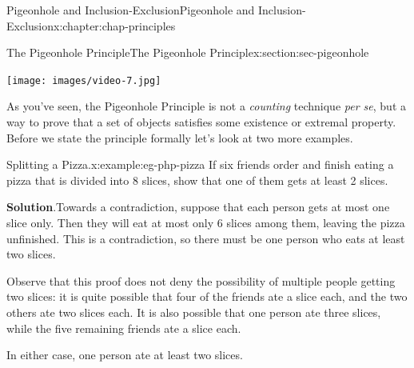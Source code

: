 \documentclass[oneside,10pt,]{book}
\newcommand{\blocktitlefont}{\relax}
\numberwithin{equation}{section}
\newlength{\qrsize}
\newlength{\previewwidth}
\begin{document}
\begin{chapterptx}{Pigeonhole and Inclusion-Exclusion}{}{Pigeonhole and Inclusion-Exclusion}{}{}{x:chapter:chap-principles}
\begin{sectionptx}{The Pigeonhole Principle}{}{The Pigeonhole Principle}{}{}{x:section:sec-pigeonhole}
\begin{sidebyside}{1}{0.1}{0.1}{0}
\begin{sbspanel}{0.8}
\begin{tcbraster}[raster columns=2, raster column skip=1pt, raster halign=center, raster force size=false, raster left skip=0pt, raster right skip=0pt]
\begin{tcolorbox}[previewstyle, width=\previewwidth]%
\texttt{[image: images/video-7.jpg]}%
\end{tcolorbox}%
\begin{tcolorbox}[qrstyle]%
{\hypersetup{urlcolor=black}}%
\end{tcolorbox}%
\end{tcbraster}%
\end{sbspanel}%
\end{sidebyside}%
\par
As you've seen, the Pigeonhole Principle is not a \emph{counting} technique \emph{per se}, but a way to prove that a set of objects satisfies some existence or extremal property. Before we state the principle formally let's look at two more examples.%
\begin{example}{Splitting a Pizza.}{x:example:eg-php-pizza}%
If six friends order and finish eating a pizza that is divided into 8 slices, show that one of them gets at least 2 slices.%
\par\smallskip%
\noindent\textbf{\blocktitlefont Solution}.\hypertarget{g:solution:id439580}{}\quad{}Towards a contradiction, suppose that each person gets at most one slice only. Then they will eat at most only 6 slices among them, leaving the pizza unfinished. This is a contradiction, so there must be one person who eats at least two slices.%
\par
Observe that this proof does not deny the possibility of multiple people getting two slices: it is quite possible that four of the friends ate a slice each, and the two others ate two slices each. It is also possible that one person ate three slices, while the five remaining friends ate a slice each.%
\par
In either case, one person ate at least two slices.%
\end{example}
%
\begin{sidebyside}{1}{0.325}{0.325}{0}%
\begin{sbspanel}{0.35}%
\end{sbspanel}
\end{sidebyside}
\end{sectionptx}
\end{chapterptx}
\end{document}
